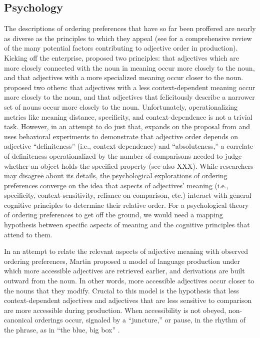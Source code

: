 \documentclass{pnastwo}
\begin{document}
\begin{article}
\subsection{Psychology}
The descriptions of ordering preferences that have so far been proffered are nearly as diverse as the principles to which they appeal (see \cite{wulff2003} for a comprehensive review of the many potential factors contributing to adjective order in production). Kicking off the enterprise, \cite{sweet1898} proposed two principles: that adjectives which are more closely connected with the noun in meaning occur more closely to the noun, and that adjectives with a more specialized meaning occur closer to the noun. \cite{ziff1960} proposed two others: that adjectives with a less context-dependent meaning occur more closely to the noun, and that adjectives that felicitously describe a narrower set of nouns occur more closely to the noun. Unfortunately, operationalizing metrics like meaning distance, specificity, and context-dependence is not a trivial task. However, in an attempt to do just that, \cite{martin1969determinants} expands on the proposal from \cite{ziff1960} and uses behavioral experiments to demonstrate that adjective order depends on adjective ``definiteness'' (i.e., context-dependence) and ``absoluteness,'' a correlate of definiteness operationalized by the number of comparisons needed to judge whether an object holds the specified property (see also \cite{kemmereretal2009} XXX).
While researchers may disagree about its details, the psychological explorations of ordering preferences converge on the idea that aspects of  adjectives' meaning (i.e., specificity, context-sensitivity, reliance on comparison, etc.) interact with general cognitive principles to determine their relative order. For a psychological theory of ordering preferences to get off the ground, we would need a mapping hypothesis between specific aspects of meaning and the cognitive principles that attend to them.

In an attempt to relate the relevant aspects of adjective meaning with observed ordering preferences, Martin \cite{martin1969competence,martin1969determinants} proposed a model of language production under which more accessible adjectives are retrieved earlier, and derivations are built outward from the noun. In other words, more accessible adjectives occur closer to the nouns that they modify. Crucial to this model is the hypothesis that less context-dependent adjectives and adjectives that are less sensitive to comparison are more accessible during production. When accessibility is not obeyed, non-canonical orderings occur, signaled by a ``juncture,'' or pause, in the rhythm of the phrase, as in ``the blue, big box'' \cite{martin1970}.


\end{article}
\end{document}
